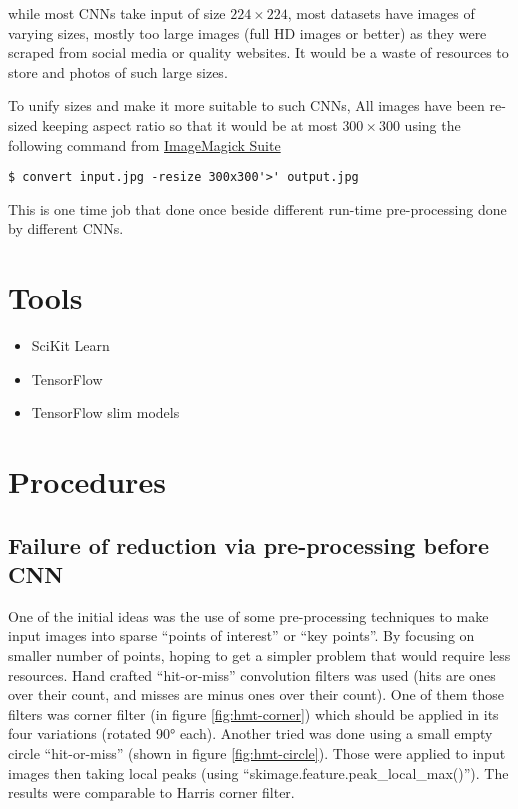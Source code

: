 while most CNNs take input of size \(224\times224\),
most datasets have images of varying sizes,
mostly too large images (full HD images or better) as they were scraped from social media or quality websites.
It would be a waste of resources to store and photos of such large sizes.

To unify sizes and make it more suitable to such CNNs,
All images have been re-sized keeping aspect ratio so that it would be at most \(300\times300\)
using the following command from \href{https://www.imagemagick.org/}{ImageMagick Suite}

\begin{verbatim}
$ convert input.jpg -resize 300x300'>' output.jpg
\end{verbatim}


This is one time job that done once beside different run-time pre-processing done by different CNNs.

\section{Tools}

\begin{itemize}
\item SciKit Learn
\item TensorFlow
\item TensorFlow slim models
\end{itemize}

\section{Procedures}

\subsection{Failure of reduction via pre-processing before CNN}

One of the initial ideas was the use of some pre-processing techniques to 
make input images into sparse ``points of interest'' or ``key points''.
By focusing on smaller number of points,
hoping to get a simpler problem that would require less resources.
Hand crafted ``hit-or-miss'' convolution filters was used
(hits are ones over their count, and misses are minus ones over their count).
One of them those filters was corner filter (in figure \ref{fig:hmt-corner}) which should be applied
in its four variations (rotated 90° each).
Another tried was done using a small empty circle ``hit-or-miss'' (shown in figure \ref{fig:hmt-circle}).
Those were applied to input images then taking local peaks (using ``skimage.feature.peak\_local\_max()'').
The results were comparable to Harris corner filter.


